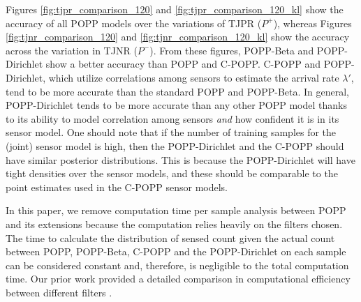Figures \ref{fig:tjpr_comparison_120} and \ref{fig:tjpr_comparison_120_kl} show the accuracy of all POPP models over the variations of TJPR ($P^+$), whereas Figures \ref{fig:tjnr_comparison_120} and \ref{fig:tjnr_comparison_120_kl} show the accuracy across the variation in TJNR ($P^-$). From these figures, POPP-Beta and POPP-Dirichlet show a better accuracy than POPP and C-POPP. C-POPP and POPP-Dirichlet, which utilize correlations among sensors to estimate the arrival rate $\lambda'$, tend to be more accurate than the standard POPP and POPP-Beta.
In general, POPP-Dirichlet tends to be more accurate than any other POPP model thanks to its ability to model correlation among sensors \emph{and} how confident it is in its sensor model.
One should note that if the number of training samples for the (joint) sensor model is high, then the POPP-Dirichlet and the C-POPP should have similar posterior distributions. This is because the POPP-Dirichlet will have tight densities over the sensor models, and these should be comparable to the point estimates used in the C-POPP  sensor models.

In this paper, we remove computation time per sample analysis between POPP and its extensions because the computation relies heavily on the filters chosen. The time to calculate the distribution of sensed count given the actual count between POPP, POPP-Beta, C-POPP and the POPP-Dirichlet on each sample can be considered constant and, therefore, is negligible to the total computation time. Our prior work provided a detailed comparison in computational efficiency between different filters \cite{jovan18a}.
